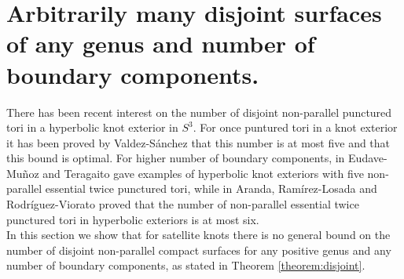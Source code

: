 \documentclass[reqno]{amsart}
\theoremstyle{definition}
\theoremstyle{remark}
\begin{document}

\section{Arbitrarily many disjoint surfaces of any genus and number of boundary components.}\label{section:non-parallel}

There has been recent interest on the number of disjoint non-parallel punctured tori in a hyperbolic knot exterior in $S^3$. For once puntured tori in a knot exterior it has been proved by Valdez-Sánchez \cite{Valdez-Sanchez-19} that this number is at most five and that this bound is optimal. For higher number of boundary components, in \cite{Eudave-Teragaito-25} Eudave-Muñoz and Teragaito gave examples of hyperbolic knot exteriors with five non-parallel essential twice punctured tori, while in \cite{Aranda-Losada-Viorato-23} Aranda,  Ramírez-Losada and Rodríguez-Viorato proved that the number of  non-parallel essential twice punctured tori in hyperbolic exteriors is at most six.\\
In this section we show that for satellite knots there is no general bound on the number of disjoint non-parallel compact surfaces for any positive genus and any number of boundary components,  as stated in Theorem \ref{theorem:disjoint}.  
\end{document}
